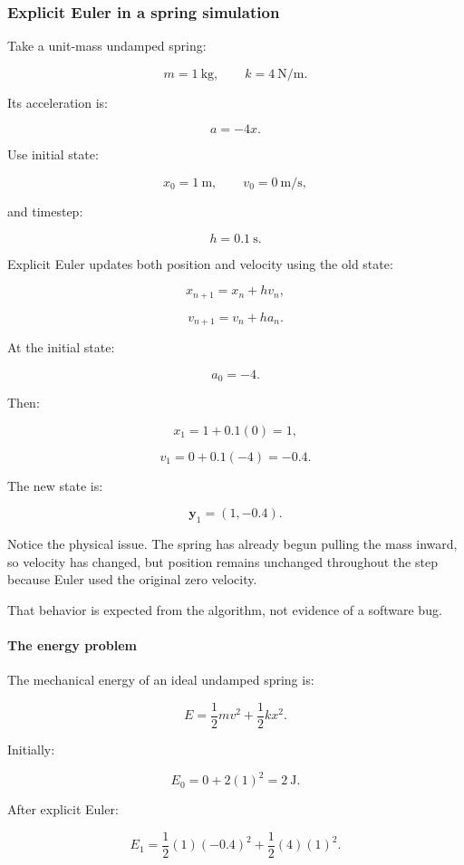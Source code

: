 \subsubsection{Explicit Euler in a spring simulation}\label{02-foundations-ii-ch025-explicit-euler-in-a-spring-simulation}

Take a unit-mass undamped spring:

\[
m=1\ \mathrm{kg}, \qquad k=4\ \mathrm{N/m}.
\]

Its acceleration is:

\[
a=-4x.
\]

Use initial state:

\[
x_0=1\ \mathrm m, \qquad v_0=0\ \mathrm{m/s},
\]

and timestep:

\[
h=0.1\ \mathrm s.
\]

Explicit Euler updates both position and velocity using the old state:

\[
x_{n+1}=x_n+hv_n,
\]

\[
v_{n+1}=v_n+ha_n.
\]

At the initial state:

\[
a_0=-4.
\]

Then:

\[
x_1=1+0.1(0)=\boxed{1},
\]

\[
v_1=0+0.1(-4)=\boxed{-0.4}.
\]

The new state is:

\[
\boxed{\mathbf y_1=(1,-0.4)}.
\]

Notice the physical issue. The spring has already begun pulling the mass inward, so velocity has changed, but position remains unchanged throughout the step because Euler used the original zero velocity.

That behavior is expected from the algorithm, not evidence of a software bug.

\paragraph{The energy problem}\label{02-foundations-ii-ch025-the-energy-problem}

The mechanical energy of an ideal undamped spring is:

\[
E=\frac12mv^2+\frac12kx^2.
\]

Initially:

\[
E_0=0+2(1)^2=\boxed{2\ \mathrm J}.
\]

After explicit Euler:

\[
E_1= \frac12(1)(-0.4)^2+ \frac12(4)(1)^2.
\]

